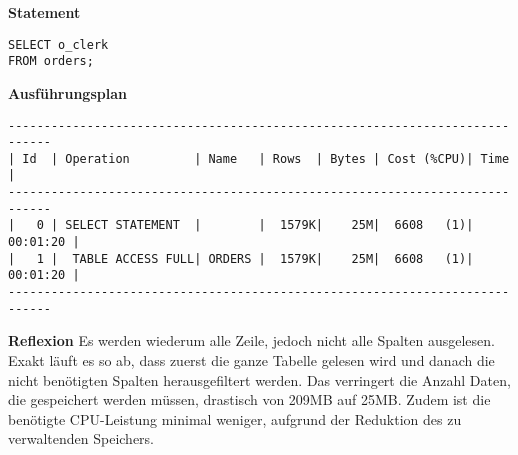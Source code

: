 \documentclass[10pt]{article}
\begin{document}
\textbf{Statement}
\begin{lstlisting}[style=sql]
SELECT o_clerk
FROM orders;
\end{lstlisting}
\textbf{Ausführungsplan}
\begin{lstlisting}[style=queryexecutionplan]
----------------------------------------------------------------------------                                                                                                                                                                                                                                 
| Id  | Operation         | Name   | Rows  | Bytes | Cost (%CPU)| Time     |                                                                                                                                                                                                                                 
----------------------------------------------------------------------------                                                                                                                                                                                                                                 
|   0 | SELECT STATEMENT  |        |  1579K|    25M|  6608   (1)| 00:01:20 |                                                                                                                                                                                                                                 
|   1 |  TABLE ACCESS FULL| ORDERS |  1579K|    25M|  6608   (1)| 00:01:20 |                                                                                                                                                                                                                                 
---------------------------------------------------------------------------- 
\end{lstlisting}   
\textbf{Reflexion} \newline
Es werden wiederum alle Zeile, jedoch nicht alle Spalten ausgelesen.
Exakt läuft es so ab, dass zuerst die ganze Tabelle gelesen wird und danach die nicht
benötigten Spalten herausgefiltert werden.
Das verringert die Anzahl Daten, die gespeichert werden müssen, drastisch von 209MB auf 25MB.
Zudem ist die benötigte CPU-Leistung minimal weniger, aufgrund der Reduktion des
zu verwaltenden Speichers.
\end{document}
